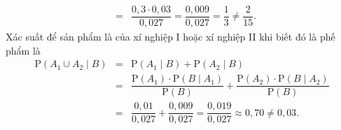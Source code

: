\begin{ex}
{\begin{itemchoice}
\begin{eqnarray*}
				&=& \dfrac{0{,}3 \cdot 0{,}03}{0{,}027} = \dfrac{0{,}009}{0{,}027} = \dfrac{1}{3}\neq \dfrac{2}{15}.
			\end{eqnarray*}
			\itemch Xác suất để sản phẩm là của xí nghiệp I hoặc xí nghiệp II khi biết đó là phế phẩm là
			\begin{eqnarray*}
				\mathrm{P}\left(A_1 \cup A_2 \mid B\right) &=& \mathrm{P}\left(A_1\mid B\right) + \mathrm{P}\left(A_2\mid B\right) \\
				&=& \dfrac{\mathrm{P}\left(A_1\right) \cdot \mathrm{P}\left(B\mid A_1\right)}{\mathrm{P}\left(B\right)} + \dfrac{\mathrm{P}\left(A_2\right) \cdot \mathrm{P}\left(B\mid A_2\right)}{\mathrm{P}\left(B\right)} \\
				&=& \dfrac{0{,}01}{0{,}027} + \dfrac{0{,}009}{0{,}027} = \dfrac{0{,}019}{0{,}027} \approx 0{,}70\neq 0{,}03.
			\end{eqnarray*}
		\end{itemchoice}
	}
\end{ex}

